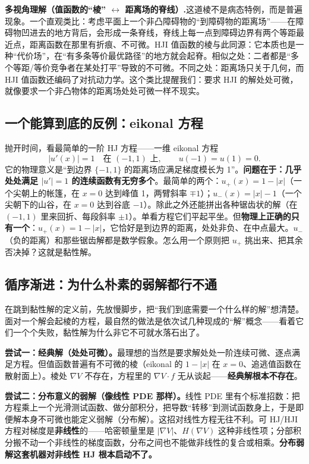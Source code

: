 \begin{note}
\textbf{多视角理解（值函数的“棱” $\leftrightarrow$ 距离场的脊线）.}\;这道棱不是病态特例，而是普遍现象。一个直观类比：考虑平面上一个非凸障碍物的“到障碍物的距离场”——在障碍物凹进去的地方背后，会形成一条脊线，脊线上每一点到障碍边界有两个等距最近点，距离函数在那里有折痕、不可微。HJI 值函数的棱与此同源：它本质也是一种“代价场”，在“有多条等价最优路径”的地方就会起脊。相似之处：二者都是“多个等距/等价竞争者在某处打平”导致的不可微。不同之处：距离场只关于几何，而 HJI 值函数还编码了对抗动力学。这个类比提醒我们：要求 HJI 的解处处可微，就像要求一个非凸物体的距离场处处可微一样不现实。
\end{note}

\subsection{一个能算到底的反例：eikonal 方程}
\label{sec:dg-eikonal}
抛开时间，看最简单的一阶 HJ 方程——一维 eikonal 方程
\begin{equation}
  |u'(x)|=1\quad\text{在 }(-1,1)\text{ 上},\qquad u(-1)=u(1)=0.
  \label{eq:dg-eikonal}
\end{equation}
它的物理意义是“到边界 $\{-1,1\}$ 的距离场应满足梯度模长为 1”。\textbf{问题在于：几乎处处满足 $|u'|=1$ 的连续函数有无穷多个}。最简单的两个：$u_+(x)=1-|x|$（一个尖朝上的帐篷，在 $x=0$ 达到峰值 1，两臂斜率 $\mp1$）；$u_-(x)=|x|-1$（一个尖朝下的山谷，在 $x=0$ 达到谷底 $-1$）。除此之外还能拼出各种锯齿状的解（在 $(-1,1)$ 里来回折、每段斜率 $\pm1$）。单看方程它们平起平坐。但\textbf{物理上正确的只有一个}：$u_+(x)=1-|x|$，它恰好是到边界的距离，处处非负、在中点最大。$u_-$（负的距离）和那些锯齿解都是数学假象。怎么用一个原则把 $u_+$ 挑出来、把其余否决掉？这就是黏性解。

\subsection{循序渐进：为什么朴素的弱解都行不通}
\label{sec:dg-weak-fail}
在跳到黏性解的定义前，先放慢脚步，把“我们到底需要一个什么样的解”想清楚。面对一个解会起棱的方程，最自然的做法是依次试几种现成的“解”概念——看着它们一个个失败，黏性解为什么非它不可就水落石出了。

\textbf{尝试一：经典解（处处可微）。}\;最理想的当然是要求解处处一阶连续可微、逐点满足方程。但值函数普遍有不可微的棱（eikonal 的 $1-|x|$ 在 $x=0$、追逃值函数在散射面上）。棱处 $\nabla V$ 不存在，方程里的 $\nabla V\cdot f$ 无从谈起——\textbf{经典解根本不存在}。

\textbf{尝试二：分布意义的弱解（像线性 PDE 那样）。}\;线性 PDE 里有个标准招数：把方程乘上一个光滑测试函数、做分部积分，把导数“转移”到测试函数身上，于是即便解本身不可微也能定义弱解（分布解）。这招对线性方程无往不利。可 HJ/HJI 方程对梯度是\textbf{非线性}的——哈密顿量里是 $|\nabla V|$、$H(\nabla V)$ 这种非线性项；分部积分搬不动一个非线性的梯度函数，分布之间也不能做非线性的复合或相乘。\textbf{分布弱解这套机器对非线性 HJ 根本启动不了。}


